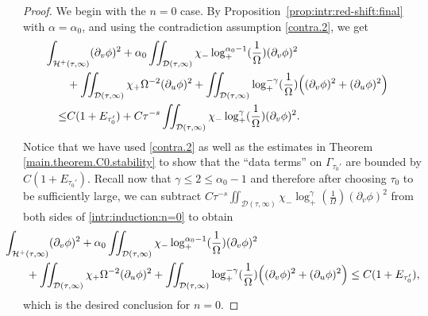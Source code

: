 \documentclass[10pt, reqno]{amsart}
\theoremstyle{definition}
\theoremstyle{remark}
\numberwithin{equation}{section}
\newcommand{\rd}{\partial}
\newcommand{\bb}{\Big}
\newcommand{\0}{\emptyset}
\newcommand{\alp}{\alpha}
\newcommand{\Gmm}{\Gamma}
\newcommand{\Omg}{\Omega}
\newcommand{\calD}{\mathcal D}
\newcommand{\calH}{\mathcal H}
\newcommand{\f}{\frac}
\newcommand{\EH}{\calH^{+}}
\begin{document}
\begin{proof}
We begin with the $n = 0$ case. By Proposition~\ref{prop:intr:red-shift:final} with $\alp=\alp_0$, and using the contradiction assumption \eqref{contra.2}, we get
\begin{equation}\label{intr:induction:n=0}
\begin{aligned}
& \hskip-2em
	\int_{\EH(\tau, \infty)} (\rd_{v} \phi)^{2} 
	+ \alp_{0}  \iint_{\calD(\tau, \infty)} \chi_{-} \log_+^{\alp_{0}-1} (\frac{1}{\Omg}) (\rd_{v} \phi)^{2} \\
	& +  \iint_{\calD(\tau, \infty)} \chi_{+} \Omg^{-2} (\rd_{u} \phi)^{2} 
	+  \iint_{\calD(\tau, \infty)} \log_+^{-\gamma}(\f{1}{\Omg}) \bb( (\rd_{v} \phi)^{2} + (\rd_{u} \phi)^{2} \bb)\\
	\leq &C(1+ E_{\tau_0'})+C\tau^{-s}\iint_{\calD(\tau, \infty)} \chi_-\log_+^{\gamma}(\f{1}{\Omg})(\rd_v\phi)^2.
\end{aligned}
\end{equation}
Notice that we have used \eqref{contra.2} as well as the estimates in Theorem \ref{main.theorem.C0.stability} to show that the ``data terms'' on $\Gmm_{\tau_0'}$ are bounded by $C(1+E_{\tau_0'})$. Recall now that $\gamma\leq 2\leq \alp_0-1$ and therefore after choosing $\tau_0$ to be sufficiently large, we can subtract $C\tau^{-s}\iint_{\calD(\tau, \infty)} \chi_-\log_+^{\gamma}(\f{1}{\Omg})(\rd_v\phi)^2$ from both sides of \eqref{intr:induction:n=0} to obtain
\begin{equation}\label{intr:induction:n=0.1}
\begin{aligned}
& \hskip-2em
	\int_{\EH(\tau, \infty)} (\rd_{v} \phi)^{2} 
	+ \alp_{0}  \iint_{\calD(\tau, \infty)} \chi_{-} \log_+^{\alp_{0}-1} (\frac{1}{\Omg}) (\rd_{v} \phi)^{2} \\
	& +  \iint_{\calD(\tau, \infty)} \chi_{+} \Omg^{-2} (\rd_{u} \phi)^{2} 
	+  \iint_{\calD(\tau, \infty)} \log_+^{-\gamma}(\f{1}{\Omg}) \bb( (\rd_{v} \phi)^{2} + (\rd_{u} \phi)^{2} \bb)
	\leq C(1+ E_{\tau_0'}),
\end{aligned}
\end{equation}
which is the desired conclusion for $n=0$.


\end{proof}
\end{document}
